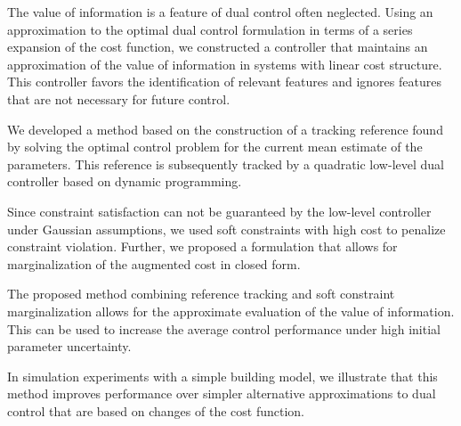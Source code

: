 The value of information is a feature of dual control often neglected. Using an
approximation to the optimal dual control formulation in terms of a series
expansion of the cost function, we constructed a controller that maintains an
approximation of the value of information in systems with linear cost
structure. This controller favors the identification of relevant features and
ignores features that are not necessary for future control.

We developed a method based on the construction of a tracking reference
found by solving the optimal control problem for the current mean estimate of
the parameters. This reference is subsequently tracked by a quadratic low-level
dual controller based on dynamic programming.

Since constraint satisfaction can not be guaranteed by the low-level controller
under Gaussian assumptions, we used soft constraints with high cost to penalize
constraint violation. Further, we proposed a formulation that allows for
marginalization of the augmented cost in closed form.

The proposed method combining reference tracking and soft constraint
marginalization allows for the approximate evaluation of the value of
information. This can be used to increase the average control performance under
high initial parameter uncertainty.

In simulation experiments with a simple building model, we illustrate that this
method improves performance over simpler alternative approximations to dual
control that are based on changes of the cost function.

